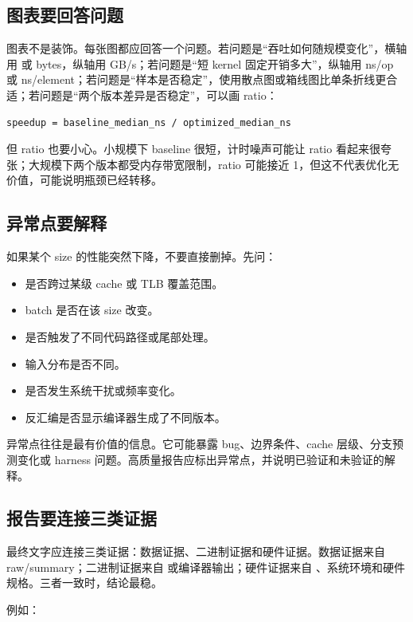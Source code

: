\subsection{图表要回答问题}

图表不是装饰。每张图都应回答一个问题。若问题是“吞吐如何随规模变化”，横轴用  或 bytes，纵轴用 GB/s；若问题是“短 kernel 固定开销多大”，纵轴用 ns/op 或 ns/element；若问题是“样本是否稳定”，使用散点图或箱线图比单条折线更合适；若问题是“两个版本差异是否稳定”，可以画 ratio：

\begin{lstlisting}
speedup = baseline_median_ns / optimized_median_ns
\end{lstlisting}

但 ratio 也要小心。小规模下 baseline 很短，计时噪声可能让 ratio 看起来很夸张；大规模下两个版本都受内存带宽限制，ratio 可能接近 1，但这不代表优化无价值，可能说明瓶颈已经转移。

\subsection{异常点要解释}

如果某个 size 的性能突然下降，不要直接删掉。先问：

\begin{itemize}
  \item 是否跨过某级 cache 或 TLB 覆盖范围。
  \item batch 是否在该 size 改变。
  \item 是否触发了不同代码路径或尾部处理。
  \item 输入分布是否不同。
  \item 是否发生系统干扰或频率变化。
  \item 反汇编是否显示编译器生成了不同版本。
\end{itemize}

异常点往往是最有价值的信息。它可能暴露 bug、边界条件、cache 层级、分支预测变化或 harness 问题。高质量报告应标出异常点，并说明已验证和未验证的解释。

\subsection{报告要连接三类证据}

最终文字应连接三类证据：数据证据、二进制证据和硬件证据。数据证据来自 raw/summary；二进制证据来自  或编译器输出；硬件证据来自 、系统环境和硬件规格。三者一致时，结论最稳。

例如：

